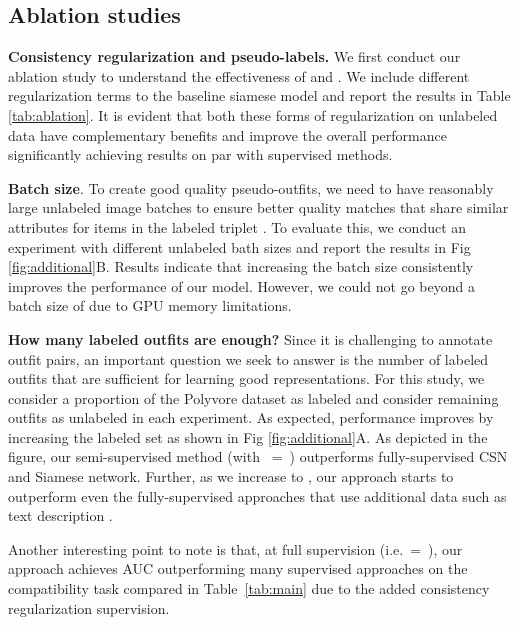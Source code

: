 \documentclass[sigconf]{acmart}
\newcommand{\ie}{i.e.}
\begin{document}
\subsection{Ablation studies}
\label{sec:ablations}
\noindent \textbf{Consistency regularization and pseudo-labels.} We first conduct our ablation study to understand the effectiveness of  and . We include different regularization terms to the baseline siamese model and report the results in Table \ref{tab:ablation}. 
It is evident that both these forms of regularization on unlabeled data have complementary benefits and improve the overall performance significantly achieving results on par with supervised methods.  

\vspace{1mm}
\noindent \textbf{Batch size}. To create good quality pseudo-outfits, we need to have reasonably large unlabeled image batches to ensure better quality matches that share similar attributes for items in the labeled triplet \cite{simclr, lee2013pseudo}. To evaluate this, we conduct an experiment with different unlabeled bath sizes and report the results in Fig \ref{fig:additional}{B}. Results indicate that increasing the batch size consistently improves the performance of our model. However, we could not go beyond a batch size of  due to \textsc{GPU} memory limitations.

\vspace{1mm}
\noindent \textbf{How many labeled outfits are enough?} Since it is challenging to annotate outfit pairs, an important question we seek to answer is the number of labeled outfits that are sufficient for learning good representations. For this study, we consider a proportion of the Polyvore dataset as labeled and consider remaining outfits as unlabeled in each experiment. As expected, performance improves by increasing the labeled set as shown in Fig \ref{fig:additional}{A}. As depicted in the figure, our semi-supervised method (with ~=~) outperforms  fully-supervised \textsc{CSN} \cite{csn} and Siamese network. Further, as we increase  to , our approach starts to outperform even the fully-supervised approaches that use additional data such as text description \cite{csn,eccv2018learning}. 

Another interesting point to note is that, at full supervision (\ie ~=~), our approach achieves  \textsc{AUC} outperforming many supervised approaches on the compatibility task compared in Table~\ref{tab:main} due to the added consistency regularization supervision. 
\end{document}

